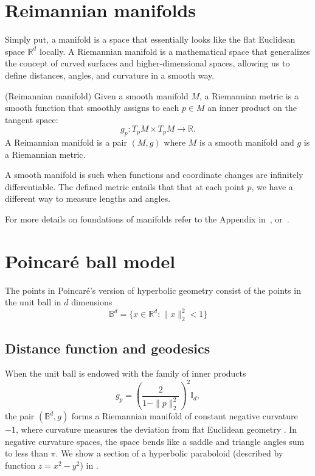 \section{Reimannian manifolds}
Simply put, a manifold is a space that essentially looks like the flat Euclidean space $\mathbb{R}^d$ locally. A Riemannian manifold is a mathematical space that generalizes the concept of curved surfaces and higher-dimensional spaces, allowing us to define distances, angles, and curvature in a smooth way. 

\begin{definition} (Reimannian manifold)
Given a smooth manifold $M$, a Riemannian metric is a smooth function that smoothly assigns to each $p \in M$ an inner product on the tangent space:
\begin{equation*}
    g_p: T_pM \times T_pM \to \mathbb{R}.
\end{equation*}
    A Reimannian manifold is a pair $(M,g)$ where $M$ is a smooth manifold and $g$ is a Riemannian metric.
\end{definition}

A smooth manifold is such when functions and coordinate changes are infinitely differentiable. The defined metric entails that that at each point $p$, we have a different way to measure lengths and angles.

For more details on foundations of manifolds refer to the Appendix in~\cite{Chami2021representationLearningAlgorithmsHyperbolicSpaces}, or~\cite{doCarmo1992riemannianGeometry}\cite{Lee2003smooth}.

\section{Poincaré ball model}
The points in Poincaré's version of hyperbolic geometry consist of the points in the unit ball in $d$ dimensions
\begin{equation*}
    \mathbb{B}^d = \{x \in \mathbb{R}^d: \|x\|^2_2 < 1\}
\end{equation*}


\subsection{Distance function and geodesics}
When the unit ball is endowed with the family of inner products
\begin{equation*}
    g_p = \left(\frac{2}{1-\|p\|^2_2}\right)^2\mathbb{I}_d,
\end{equation*}
the pair $(\mathbb{B}^d,g)$ forms a Riemannian manifold of constant negative curvature $-1$, where curvature measures the deviation from flat Euclidean geometry 
. In negative curvature spaces, the space bends like a saddle and triangle angles sum to less than $\pi$. We show a section of a hyperbolic paraboloid (described by function $z=x^2-y^2$) in .

